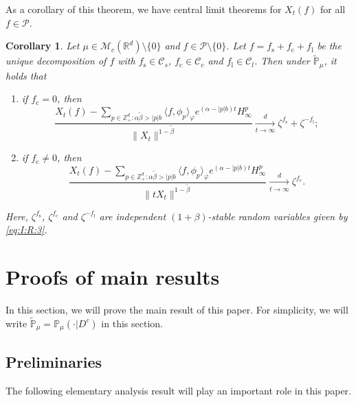 \documentclass[12pt,a4paper]{amsart}
\theoremstyle{plain}
\newtheorem{cor}[thm]{Corollary}
\theoremstyle{definition}
\numberwithin{equation}{section}
\begin{document}
As a corollary of this theorem, we have {\color{red} central limit theorems for $X_t(f)$ for all $f\in \mathcal P$.}

\begin{cor} Let $\mu\in \mathcal M_c(\mathbb R^d)\setminus \{0\}$ and $f\in \mathcal P\setminus\{0\}$. Let {\color{red} $f=f_\mathrm s + f_\mathrm c + f_\mathrm l$ be the unique decomposition of $f$} with $f_\mathrm s \in \mathcal C_s$, $f_\mathrm c \in \mathcal C_c$ and $f_\mathrm l \in \mathcal C_l$.
Then under $\widetilde {\mathbb{P}}_{\mu}$, it holds that
\begin{enumerate}
\item  {\color{red}if $f_\mathrm c=0$}, then
\[
    \frac{ X_t(f) - \sum_{p\in \mathbb Z^d_+:\alpha \tilde \beta>|p|b}\langle f,\phi_p\rangle_\varphi e^{(\alpha-|p|b)t}H^p_{\infty} }{\|X_t\|^{1-\tilde \beta}}
    \xrightarrow[t\to \infty]{d}
     \zeta^{f_\mathrm s}+\zeta^{-f_\mathrm l};
\]
\item  {\color{red}if $f_\mathrm c\neq0$}, then
\[
  \frac{ X_t(f) - \sum_{p\in \mathbb Z^d_+:\alpha \tilde \beta>|p|b}\langle f,\phi_p\rangle_\varphi e^{(\alpha-|p|b)t}H^p_{\infty} }{\|tX_t\|^{1-\tilde \beta}}
    \xrightarrow[t\to \infty]{d}\zeta^{f_\mathrm c}.
\]
\end{enumerate}
{\color{red} Here, $\zeta^{f_\mathrm s}$, $\zeta^{f_\mathrm c}$ and $\zeta^{-f_\mathrm l}$ are independent $(1+\beta)$-stable random variables given by \eqref{eq:I:R:3}.}
\end{cor}


\section{Proofs of main results}
\label{proofs of main results}
In this section, we will prove the main result of this paper.
For simplicity, we will write $\mathbb{\widetilde{P}}_{\mu}=\mathbb{P}_{\mu}(\cdot|D^c)$ in this section.

\subsection{Preliminaries}

The following  elementary analysis result will play an important role in this paper.
\end{document}
